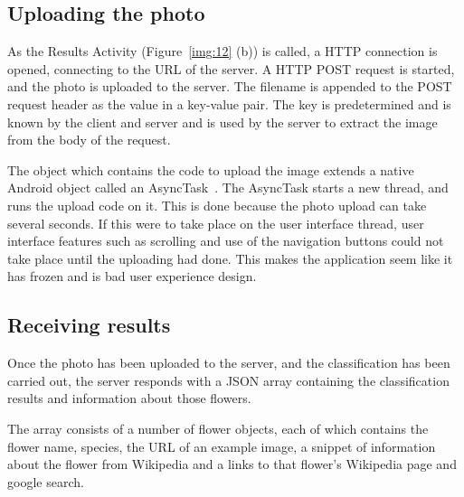\documentclass[11pt, a4paper]{report}
\begin{document}

\subsection{Uploading the photo}

As the Results Activity (Figure~\ref{img:12} (b)) is called, a HTTP connection is opened, connecting to the URL of the server. A HTTP POST request is started, and the photo is uploaded to the server. The filename is appended to the POST request header as the value in a key-value pair. The key is predetermined and is known by the client and server and is used by the server to extract the image from the body of the request. 

The object which contains the code to upload the image extends a native Android object called an AsyncTask~\cite{AndroidDev:AsyncTask}. The AsyncTask starts a new thread, and runs the upload code on it. This is done because the photo upload can take several seconds. If this were to take place on the user interface thread, user interface features such as scrolling and use of the navigation buttons could not take place until the uploading had done. This makes the application seem like it has frozen and is bad user experience design.

\subsection{Receiving results}

Once the photo has been uploaded to the server, and the classification has been carried out, the server responds with a JSON array containing the classification results and information about those flowers. 

The array consists of a number of flower objects, each of which contains the flower name, species, the URL of an example image, a snippet of information about the flower from Wikipedia and a links to that flower's Wikipedia page and google search.
\end{document}
